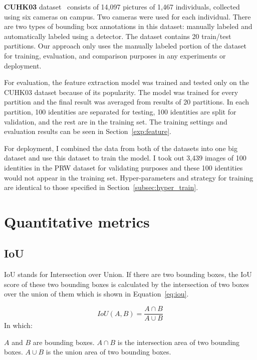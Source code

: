 \documentclass[../main.tex]{subfiles}
\begin{document}
\textbf{CUHK03} dataset~\cite{li2014deepreid} consists of 14,097 pictures of 1,467 individuals, collected using six cameras on campus. Two cameras were used for each individual. There are two types of bounding box annotations in this dataset: manually labeled and automatically labeled using a detector. The dataset contains 20 train/test partitions. Our approach only uses the manually labeled portion of the dataset for training, evaluation, and comparison purposes in any experiments or deployment. 

For evaluation, the feature extraction model was trained and tested only on the CUHK03 dataset because of its popularity. The model was trained for every partition and the final result was averaged from results of 20 partitions. In each partition, 100 identities are separated for testing, 100 identities are split for validation, and the rest are in the training set. The training settings and evaluation results can be seen in Section~\ref{exp:feature}.

For deployment, I combined the data from both of the datasets into one big dataset and use this dataset to train the model. I took out 3,439 images of 100 identities in the PRW dataset for validating purposes and these 100 identities would not appear in the training set. Hyper-parameters and strategy for training are identical to those specified in Section~\ref{subsec:hyper_train}.

\section{Quantitative metrics}
\subsection{IoU}
\label{metric:iou}
IoU stands for Intersection over Union. If there are two bounding boxes, the IoU score of these two bounding boxes is calculated by the intersection of two boxes over the union of them which is shown in Equation~\ref{eq:iou}.

\begin{equation}\label{eq:iou}
    IoU(A, B) = \dfrac {A \cap B} {A \cup B}
\end{equation}
In which:
\begin{outline}
 \1 $A$ and $B$ are bounding boxes.
 \1 $A \cap B$ is the intersection area of two bounding boxes.
 \1 $A \cup B$ is the union area of two bounding boxes.
\end{outline}
\end{document}
